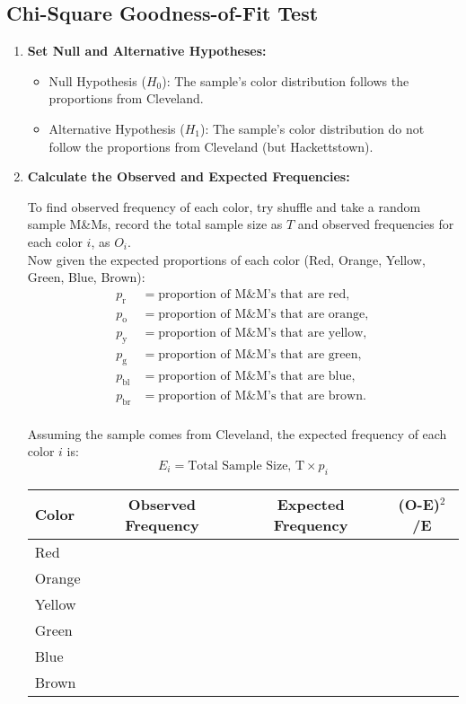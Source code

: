 \documentclass{article}
\begin{document}
\subsection*{Chi-Square Goodness-of-Fit Test}
\begin{enumerate}
    \item \textbf{Set Null and Alternative Hypotheses:}
    \begin{itemize}
        \item Null Hypothesis ($H_0$): The sample's color distribution follows the proportions from Cleveland.
        \item Alternative Hypothesis ($H_1$): The sample's color distribution do not follow the proportions from Cleveland (but Hackettstown).
    \end{itemize}

    \item \textbf{Calculate the Observed and Expected Frequencies:}

    To find observed frequency of each color, try shuffle and take a random sample M\&Ms, record the total sample size as $T$ and observed frequencies for each color $i$, as $O_{i}$. \\
    
    Now given the expected proportions of each color (Red, Orange, Yellow, Green, Blue, Brown):
    \begin{align*}
    p_{\text{r}}  & = \text{proportion of M\&M's that are red}, \\
    p_{\text{o}}  & = \text{proportion of M\&M's that are orange}, \\
    p_{\text{y}}  & = \text{proportion of M\&M's that are yellow}, \\
    p_{\text{g}}  & = \text{proportion of M\&M's that are green}, \\
    p_{\text{bl}} & = \text{proportion of M\&M's that are blue}, \\
    p_{\text{br}} & = \text{proportion of M\&M's that are brown}. \\
    \end{align*}

    Assuming the sample comes from Cleveland, the expected frequency of each color $i$ is:
    \[
    E_i = \text{Total Sample Size, T} \times {p}_i
    \]
    
    \begin{table}[h!]
    \centering
    \begin{tabular}{|l|c|c|c|}
    \hline
    \textbf{Color} & \textbf{Observed Frequency} & \textbf{Expected Frequency} & \textbf{(O-E)\(^2\)/E} \\
    \hline
    Red &  &  &   \\
    \hline
    Orange &  &  &  \\
    \hline
    Yellow &  &  &  \\
    \hline
    Green &  &  &  \\
    \hline
    Blue &  &  &  \\
    \hline
    Brown &  &  &  \\
    \hline
    \end{tabular}
    \end{table}
    

\end{enumerate}
\end{document}
